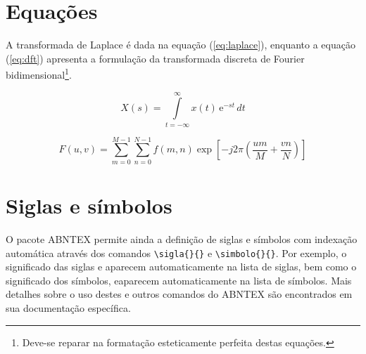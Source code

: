 \section{Equações}
\label{sec:equacoes}

A transformada de Laplace é dada na equação (\ref{eq:laplace}), enquanto a equação (\ref{eq:dft}) apresenta a formulação da transformada discreta de Fourier bidimensional\footnote{Deve-se reparar na formatação esteticamente perfeita destas equações.}.

\begin{equation}
	X(s) = \int\limits_{t = -\infty}^{\infty} x(t) \, \text{e}^{-st} \, dt
	\label{eq:laplace}
\end{equation}

\begin{equation}
	F(u, v) = \sum_{m = 0}^{M - 1} \sum_{n = 0}^{N - 1} f(m, n) \exp \left[ -j 2 \pi \left( \frac{u m}{M} + \frac{v n}{N} \right) \right]
	\label{eq:dft}
\end{equation}

\section{Siglas e símbolos}
\label{sec:siglas}

O pacote ABNTEX permite ainda a definição de siglas e símbolos com indexação automática através dos comandos \verb#\sigla{}{}# e \verb#\simbolo{}{}#. Por exemplo, o significado das siglas  e  aparecem automaticamente na lista de siglas, bem como o significado dos símbolos, eaparecem automaticamente na lista de símbolos. Mais detalhes sobre o uso destes e outros comandos do ABNTEX são encontrados em sua documentação específica\cite{abnTeX2009}.

%
%
